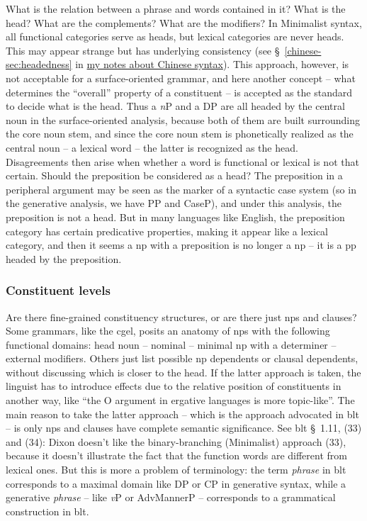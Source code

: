 \documentclass[UTF8, a4paper, oneside, scheme=plain]{ctexart}
\newcommand*{\citesec}[1]{\S~{#1}}
\newcommand*{\term}[1]{\emph{#1}}
\newcommand{\chinesenote}{\href{../Chinese/main.pdf}{my notes about Chinese syntax}}
\begin{document}
What is the relation between a phrase and words contained in it?
What is the head? What are the complements? What are the modifiers?
In Minimalist syntax, all functional categories serve as heads,
but lexical categories are never heads.
This may appear strange but has underlying consistency 
(see \citesec{\ref{chinese-sec:headedness}} in \chinesenote).
This approach, however, is not acceptable for a surface-oriented grammar,
and here another concept -- what determines the ``overall'' property of a constituent -- 
is accepted as the standard to decide what is the head. 
Thus a \term{n}P and a DP are all headed by the central noun in the surface-oriented analysis,
because both of them are built surrounding the core noun stem,
and since the core noun stem is phonetically realized as the central noun -- a lexical word --
the latter is recognized as the head.
Disagreements then arise when whether a word is functional or lexical is not that certain.
Should the preposition be considered as a head? 
The preposition in a peripheral argument may be seen as the marker of a syntactic case system 
(so in the generative analysis, we have PP and CaseP),
and under this analysis, the preposition is not a head.
But in many languages like English, 
the preposition category has certain predicative properties,
making it appear like a lexical category, 
and then it seems a \ac{np} with a preposition is no longer a \ac{np} -- 
it is a \ac{pp} headed by the preposition.

\subsubsection{Constituent levels}

Are there fine-grained constituency structures, or are there just \acl{np}s and clauses?
Some grammars, like the \ac{cgel}, 
posits an anatomy of \ac{np}s with the following functional domains:
head noun -- nominal -- minimal \ac{np} with a determiner -- external modifiers.
Others just list possible \ac{np} dependents or clausal dependents,
without discussing which is closer to the head. 
If the latter approach is taken,
the linguist has to introduce effects due to the relative position of constituents in another way,
like ``the O argument in ergative languages is more topic-like''.
The main reason to take the latter approach -- which is the approach advocated in \ac{blt} --
is only \ac{np}s and clauses have complete semantic significance.
See \ac{blt} \citesec{1.11}, (33) and (34):
Dixon doesn't like the binary-branching (Minimalist) approach (33),
because it doesn't illustrate the fact that the function words are different from lexical ones. 
But this is more a problem of terminology:
the term \term{phrase} in \ac{blt} corresponds to a maximal domain like DP or CP in generative syntax,
while a generative \term{phrase} -- like \term{v}P or AdvMannerP -- 
corresponds to a grammatical construction in \ac{blt}.
\end{document}
